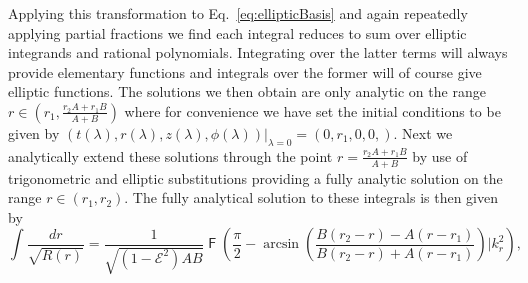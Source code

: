 \documentclass[12pt, amsmath]{revtex4-2}
\newcommand\lam{\lambda}
\newcommand\EN{\mathcal{E}}
\newcommand{\elF}{\operatorname{\mathsf{F}}}%
\begin{document}
Applying this transformation to Eq.~\eqref{eq:ellipticBasis} and again repeatedly applying partial fractions we find each integral reduces to sum over elliptic integrands and rational polynomials. Integrating over the latter terms will always provide elementary functions and integrals over the former will of course give elliptic functions. The solutions we then obtain are only analytic on the range $r\in (r_1, \frac{r_2A+r_1B}{A+B})$ where for convenience we have set the initial conditions to be given by $(t(\lam),r(\lam),z(\lam),\phi(\lam))|_{\lam=0} =(0,r_1,0,0, )$. Next we analytically extend these solutions through the point $r =\frac{r_2A+r_1B}{A+B}$ by use of trigonometric and elliptic substitutions providing a fully analytic solution on the range $r\in(r_1,r_2)$. The fully analytical solution to these integrals is then given by
\begin{equation}\label{eq:MINOsolution}
     \int\frac{dr}{\sqrt{ R(r)}} = \frac{1}{\sqrt{(1-\EN^2)A B}} \elF\left( \frac{\pi}{2}-
\arcsin\left(\frac{B(r_2-r) - A(r-r_1)}{ B(r_2-r)+A(r-r_1)}\right)\bigg| k_r^2\right),
\end{equation}
\end{document}
